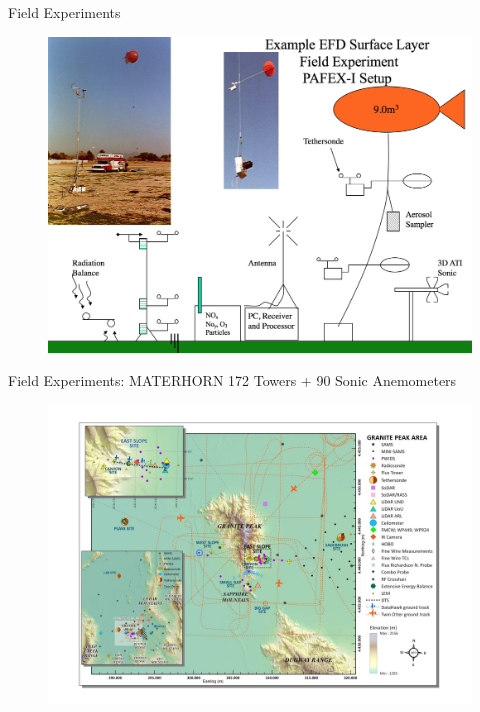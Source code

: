 \begin{frame}{Field Experiments}
\begin{figure}
	\includegraphics[width=1\textwidth]{materhorn1.png}
\end{figure}
\end{frame}

\begin{frame}{Field Experiments: MATERHORN}
172 Towers + 90 Sonic Anemometers
\begin{figure}
	\includegraphics[width=1\textwidth]{materhorn2.png}
\end{figure}
\end{frame}

